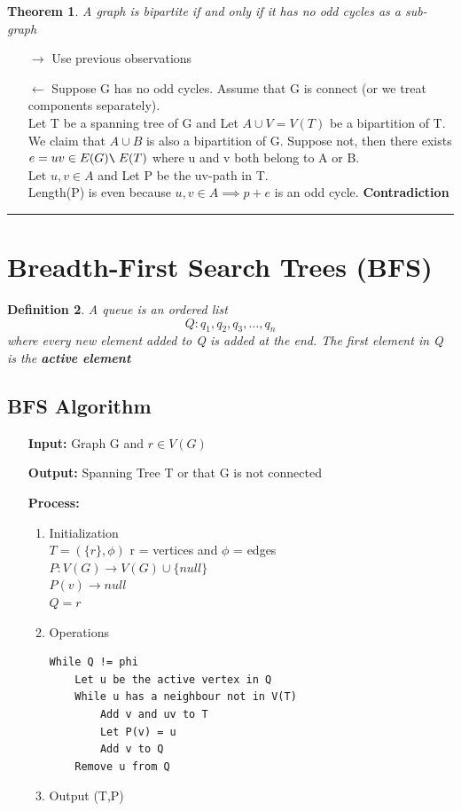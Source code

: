 \documentclass{article}
\newcounter{lecnum}
\newcommand{\bs}{
		\texttt{\char`\\ \hspace{0.1cm}} 
	}
\newtheorem{theorem}{Theorem}[lecnum]
\newtheorem{definition}[theorem]{Definition}
\newenvironment{proof}{{\bf Proof:}}{\hfill\rule{2mm}{2mm}}
\begin{document}
\begin{theorem}
A graph is bipartite if and only if it has no odd cycles as a sub-graph 
\end{theorem}
\newpage
\begin{proof}
\begin{itemize}
\item[\(\rightarrow\)] Use previous observations
\item[\(\leftarrow\)] Suppose G has no odd cycles. Assume that G is connect (or we treat components separately). \\
Let T be a spanning tree of G and Let \(A \cup V = V(T)\) be a bipartition of T. \\ \newline 
We claim that \(A \cup B\) is also a bipartition of G. Suppose not, then there exists \(e = uv \in E(G) \bs E(T)\) where u and v both belong to A or B. \\ \newline 
Let \(u,v \in A\) and Let P be the uv-path in T.\\
Length(P) is even because \(u,v \in A \implies p+e\) is an odd cycle. \textbf{Contradiction}  
\end{itemize}
\end{proof}

\section{Breadth-First Search Trees (BFS)}

\begin{definition}
A queue is an ordered list 
$$ Q : q_1, q_2, q_3, \ldots, q_n $$
where every new element added to Q is added at the end. The first element in Q is the \textbf{active element}
\end{definition}

\subsection*{BFS Algorithm}
\begin{itemize}
\item[\textbf{Input:}] Graph G and \(r \in V(G)\)
\item[\textbf{Output:}] Spanning Tree T or that G is not connected
\item[\textbf{Process:}]
\begin{enumerate}
\item Initialization \\
\(T = (\{r\}, \phi)\)  r = vertices and \(\phi\) = edges\\
\(P:V(G) \rightarrow V(G) \cup \{null\} \)\\
\(P(v) \rightarrow null \)\\
\(Q = r\)
\item Operations
\begin{lstlisting}
While Q != phi 
	Let u be the active vertex in Q
	While u has a neighbour not in V(T) 
		Add v and uv to T 
		Let P(v) = u
		Add v to Q 
	Remove u from Q
\end{lstlisting}
\item Output (T,P)
\end{enumerate}
\end{itemize}
\end{document}
